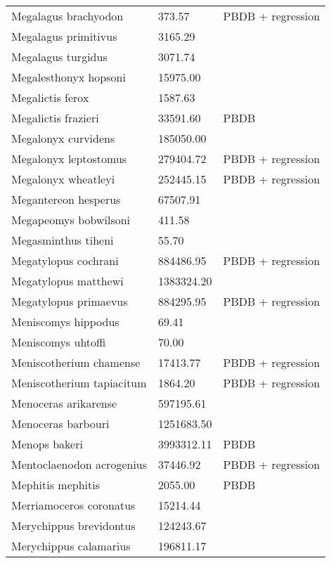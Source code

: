 \begin{center}
\begin{longtable}{p{} p{} p{} }
  Megalagus brachyodon & 373.57 & PBDB + regression \\ 
  Megalagus primitivus & 3165.29 & \cite{Tomiya2013} \\ 
  Megalagus turgidus & 3071.74 & \cite{Tomiya2013} \\ 
  Megalesthonyx hopsoni & 15975.00 & \cite{Hay1916} \\ 
  Megalictis ferox & 1587.63 & \cite{Tomiya2013} \\ 
  Megalictis frazieri & 33591.60 & PBDB \\ 
  Megalonyx curvidens & 185050.00 & \cite{McDonald2005} \\ 
  Megalonyx leptostomus & 279404.72 & PBDB + regression \\ 
  Megalonyx wheatleyi & 252445.15 & PBDB + regression \\ 
  Megantereon hesperus & 67507.91 & \cite{Tomiya2013} \\ 
  Megapeomys bobwilsoni & 411.58 & \cite{Tomiya2013} \\ 
  Megasminthus tiheni & 55.70 & \cite{Tomiya2013} \\ 
  Megatylopus cochrani & 884486.95 & PBDB + regression \\ 
  Megatylopus matthewi & 1383324.20 & \cite{Tomiya2013} \\ 
  Megatylopus primaevus & 884295.95 & PBDB + regression \\ 
  Meniscomys hippodus & 69.41 & \cite{Tomiya2013} \\ 
  Meniscomys uhtoffi & 70.00 & \cite{McKenna2011} \\ 
  Meniscotherium chamense & 17413.77 & PBDB + regression \\ 
  Meniscotherium tapiacitum & 1864.20 & PBDB + regression \\ 
  Menoceras arikarense & 597195.61 & \cite{Tomiya2013} \\ 
  Menoceras barbouri & 1251683.50 & \cite{Tomiya2013} \\ 
  Menops bakeri & 3993312.11 & PBDB \\ 
  Mentoclaenodon acrogenius & 37446.92 & PBDB + regression \\ 
  Mephitis mephitis & 2055.00 & PBDB \\ 
  Merriamoceros coronatus & 15214.44 & \cite{Tomiya2013} \\ 
  Merychippus brevidontus & 124243.67 & \cite{Tomiya2013} \\ 
  Merychippus calamarius & 196811.17 & \cite{Tomiya2013} \\ 

\end{longtable}
\end{center}
